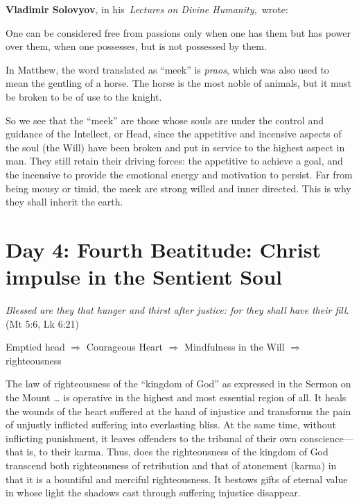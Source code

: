 \textbf{Vladimir Solovyov}, in his \emph{Lectures on Divine Humanity,} wrote:

\begin{quotex}
One can be considered free from passions only when one has them but has power over them, when one possesses, but is not possessed by them.

\end{quotex}

In Matthew, the word translated as ``meek'' is \emph{praos}, which was also used to mean the gentling of a horse. The horse is the most noble of animals, but it must be broken to be of use to the knight.


So we see that the ``meek'' are those whose souls are under the control and guidance of the Intellect, or Head, since the appetitive and incensive aspects of the soul (the Will) have been broken and put in service to the highest aspect in man. They still retain their driving forces: the appetitive to achieve a goal, and the incensive to provide the emotional energy and motivation to persist. Far from being mousy or timid, the meek are strong willed and inner directed. This is why they shall inherit the earth.

\section{Day 4: Fourth Beatitude: Christ impulse in the Sentient Soul}

\emph{Blessed are they that hunger and thirst after justice: for they shall have their fill}. (Mt 5:6, Lk 6:21)

Emptied head $\Rightarrow$ Courageous Heart $\Rightarrow$ Mindfulness in the Will $\Rightarrow$ righteousness

\begin{quotex}
The law of righteousness of the ``kingdom of God'' as expressed in the Sermon on the Mount … is operative in the highest and most essential region of all. It heals the wounds of the heart suffered at the hand of injustice and transforms the pain of unjustly inflicted suffering into everlasting bliss. At the same time, without inflicting punishment, it leaves offenders to the tribunal of their own conscience—that is, to their karma. Thus, does the righteousness of the kingdom of God transcend both righteousness of retribution and that of atonement (karma) in that it is a bountiful and merciful righteousness. It bestows gifts of eternal value in whose light the shadows cast through suffering injustice disappear. 

\end{quotex}

